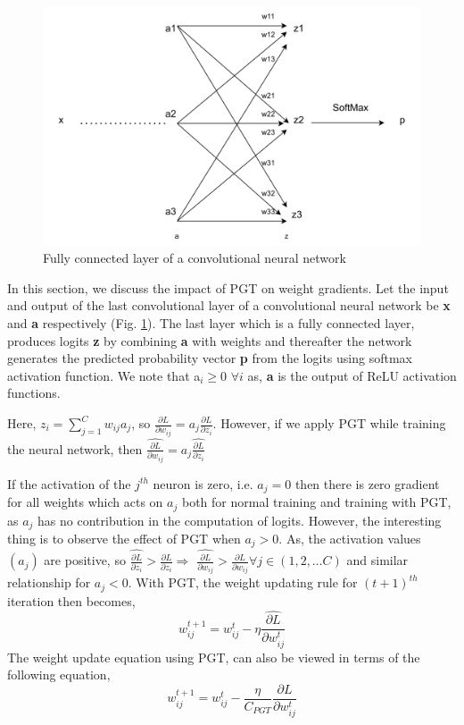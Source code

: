\documentclass[times,sort&compress]{elsarticle}
\begin{document}
\begin{figure}[t]
\centering
\includegraphics[scale=1.0,width=0.5\columnwidth]{simplenn.jpg}
\caption{Fully connected layer of a convolutional neural network} 
\label{fig:simplenn}
\end{figure} 




In this section, we discuss the impact of PGT on weight gradients. Let the input and
output of the last convolutional layer of a convolutional neural network be \textbf{x}
and \textbf{a} respectively (Fig. \ref{fig:simplenn}). The last layer which is a fully
connected layer, produces logits \textbf{z} by combining \textbf{a} with weights and
thereafter the network generates the predicted probability vector \textbf{p} from the
logits using softmax activation function. We note that a$_i \geq 0$ $ \forall i$  as,
\textbf{a} is the output of ReLU activation functions.


Here, $z_i = \sum_{j=1}^{C}w_{ij}a_j$, so $\frac{\partial L}{\partial w_{ij}} =
a_j\frac{\partial L}{\partial z_{i}} $. However, if we apply PGT while training the
neural network, then $\widehat{\frac{\partial L}{\partial w_{ij}}}
=a_j\widehat{\frac{\partial L}{\partial z_i}}$

If the activation of the $j^{th}$ neuron is zero, i.e. $a_j = 0$ then there is zero
gradient for all weights which acts on $a_j$ both for normal training and training with
PGT, as $a_j$ has no contribution in the computation of logits. However, the interesting
thing is to observe the effect of PGT when $a_j > 0$. As, the activation values $(a_j)$
are positive, so $ \widehat{\frac{\partial L}{\partial z_i}}  > \frac{\partial
L}{\partial z_{i}} \Rightarrow$ $\widehat{\frac{\partial L}{\partial w_{ij}}} >
\frac{\partial L}{\partial w_{ij}} \forall j \in (1,2,\ldots C)$ and similar
relationship for $a_j < 0$. With PGT, the weight updating rule for $(t+1)^{th}$
iteration then becomes,
\begin{equation}
\label{weight_update_PGT}
w_{ij}^{t+1} = w_{ij}^{t} - \eta \widehat{\frac{\partial L}{\partial w_{ij}^{t}}}
\end{equation}
The weight update equation using PGT, can also be viewed in terms of the following
equation,
\begin{equation}
\label{weight_update_final_PGT}
w_{ij}^{t+1} = w_{ij}^{t} - \frac{\eta}{C_{PGT}} \frac{\partial L}{\partial w_{ij}^{t}}
\end{equation}
\end{document}
